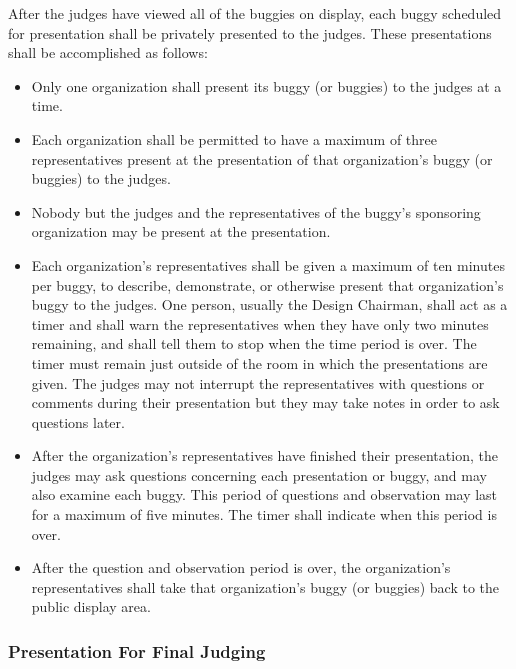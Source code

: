 	After the judges have viewed all of the buggies on display, each buggy scheduled for presentation shall be privately presented to the judges. These presentations shall be accomplished as follows:
	
	\begin{itemize}

		\item
		Only one organization shall present its buggy (or buggies) to the judges at a time.

		\item
		Each organization shall be permitted to have a maximum of three representatives present at the presentation of that organization's buggy (or buggies) to the judges.

		\item
		Nobody but the judges and the representatives of the buggy's sponsoring organization may be present at the presentation.

		\item
		Each organization's representatives shall be given a maximum of ten minutes per buggy, to describe, demonstrate, or otherwise present that organization's buggy to the judges. One person, usually the Design Chairman, shall act as a timer and shall warn the representatives when they have only two minutes remaining, and shall tell them to stop when the time period is over. The timer must remain just outside of the room in which the presentations are given. The judges may not interrupt the representatives with questions or comments during their presentation but they may take notes in order to ask questions later.

		\item
		After the organization's representatives have finished their presentation, the judges may ask questions concerning each presentation or buggy, and may also examine each buggy. This period of questions and observation may last for a maximum of five minutes. The timer shall indicate when this period is over.

		\item
		After the question and observation period is over, the organization's representatives shall take that organization's buggy (or buggies) back to the public display area.


	\end{itemize}

\subsubsection{Presentation For Final Judging}

